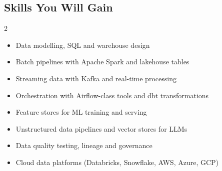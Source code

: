 \documentclass[10pt,a4paper]{article}
\begin{document}
\subsection*{Skills You Will Gain}\begin{multicols}{2}\begin{itemize}\small
\item Data modelling, SQL and warehouse design
\item Batch pipelines with Apache Spark and lakehouse tables
\item Streaming data with Kafka and real-time processing
\item Orchestration with Airflow-class tools and dbt transformations
\item Feature stores for ML training and serving
\item Unstructured data pipelines and vector stores for LLMs
\item Data quality testing, lineage and governance
\item Cloud data platforms (Databricks, Snowflake, AWS, Azure, GCP)
\end{itemize}\end{multicols}
\end{document}
